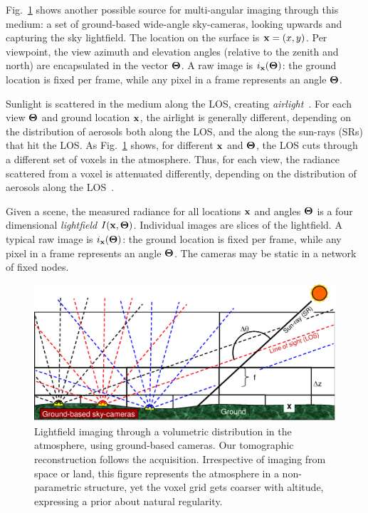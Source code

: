 \documentclass[10pt,twocolumn,letterpaper]{article}
\begin{document}
Fig.~\ref{fig:groundgrid} shows another possible source for multi-angular imaging through this medium: a set of ground-based wide-angle sky-cameras, looking upwards and capturing the sky lightfield. The location on the surface is ${\bf x}=(x,y)$. Per viewpoint, the view azimuth and elevation angles (relative to the zenith and north) are encapsulated in the vector ${\bf{\Theta}}$.  A raw image is $i_{\bf x}({\bf{\Theta}})$: the ground location is fixed per frame, while any pixel in a frame represents an angle ${\bf{\Theta}}$.

Sunlight is scattered in the medium along the LOS, creating {\em airlight}~\cite{fattal,narasimhan2,Hschechner2,tan}. For each view ${\bf{\Theta}}$ and ground location ${\bf x}$, the airlight is generally different, depending on the distribution of aerosols both along the LOS, and the along the sun-rays (SRs) that hit the LOS.
As Fig.~\ref{fig:groundgrid} shows, for different ${\bf x}$ and ${\bf{\Theta}}$, the LOS cuts through a different set of voxels in the atmosphere. Thus, for each view, the radiance scattered from a voxel is attenuated differently, depending on the distribution of aerosols along the LOS~\cite{hansen}.

Given a scene, the measured radiance for all locations ${\bf x}$ and angles ${\bf{\Theta}}$ is a four dimensional {\em lightfield} $I({\bf x},{\bf{\Theta}})$. Individual images are slices of the lightfield. A typical raw image is $i_{\bf x}({\bf{\Theta}})$: the ground location is fixed per frame, while any pixel in a frame represents an angle ${\bf{\Theta}}$.
The cameras may be static in a network of fixed nodes.
\begin{figure}[b!]
   \begin{center}
\vspace{-0.4cm}
    \includegraphics[width=0.99\linewidth]{groundtomog6.eps}
    \end{center}\vspace{-1.5cm}
    \caption{\small
    Lightfield imaging through a volumetric distribution in
    the atmosphere, using ground-based cameras. Our tomographic reconstruction
    follows the acquisition. Irrespective of imaging from space or land, this figure represents the atmosphere in a non-parametric structure, yet the voxel grid gets coarser with altitude, expressing a prior about natural regularity.}
   \label{fig:groundgrid}
\end{figure}
\end{document}
